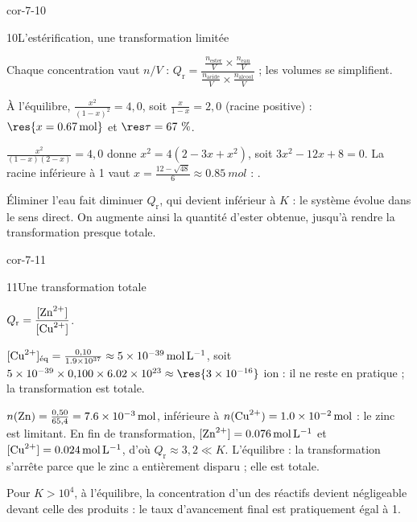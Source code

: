 \begin{blocLivre}{cor-7-10}
\begin{corrige}{10}{L'estérification, une transformation limitée}
\begin{questions}
\item Chaque concentration vaut $n/V$ : $Q_\mathrm{r}=\dfrac{\frac{n_\text{ester}}{V}\times\frac{n_\text{eau}}{V}}{\frac{n_\text{acide}}{V}\times\frac{n_\text{alcool}}{V}}$ ;
les volumes se simplifient.
\item À l'équilibre, $\frac{x^2}{(1-x)^2}=4{,}0$, soit $\frac{x}{1-x}=2{,}0$ (racine positive) : $\res{x=\qty{0,67}{mol}}$ et
$\res{\tau=67~\%}$.
\item $\frac{x^2}{(1-x)(2-x)}=4{,}0$ donne $x^2=4(2-3x+x^2)$, soit $3x^2-12x+8=0$. La racine inférieure à 1 vaut
$x=\frac{12-\sqrt{48}}{6}\approx\qty{0,85}{mol}$ : .
\item Éliminer l'eau fait diminuer $Q_\mathrm{r}$, qui devient inférieur à $K$ : le système évolue dans le sens direct.
On augmente ainsi la quantité d'ester obtenue, jusqu'à rendre la transformation presque totale.
\end{questions}
\end{corrige}
\end{blocLivre}
\begin{blocLivre}{cor-7-11}
\begin{corrige}{11}{Une transformation totale}
\begin{questions}
\item $Q_\mathrm{r}=\dfrac{[\ce{Zn^2+}]}{[\ce{Cu^2+}]}$.
\item $[\ce{Cu^2+}]_\text{éq}=\frac{0{,}10}{\num{1.9e37}}\approx\qty{5e-39}{mol.L^{-1}}$, soit
$\num{5e-39}\times0{,}100\times\num{6.02e23}\approx\res{\num{3e-16}}$ ion : il ne reste en pratique 
 ; la transformation est totale.
\item $n(\ce{Zn})=\frac{0{,}50}{65{,}4}=\qty{7,6e-3}{mol}$, inférieure à $n(\ce{Cu^2+})=\qty{1,0e-2}{mol}$ : le zinc est limitant. En fin
de transformation, $[\ce{Zn^2+}]=\qty{0,076}{mol.L^{-1}}$ et $[\ce{Cu^2+}]=\qty{0,024}{mol.L^{-1}}$, d'où
$Q_\mathrm{r}\approx3{,}2\ll K$. L'équilibre  : la transformation s'arrête parce que le zinc a
entièrement disparu ; elle est totale.
\item Pour $K>10^4$, à l'équilibre, la concentration d'un des réactifs devient négligeable devant celle des produits :
le taux d'avancement final est pratiquement égal à 1.
\end{questions}
\end{corrige}
\end{blocLivre}
